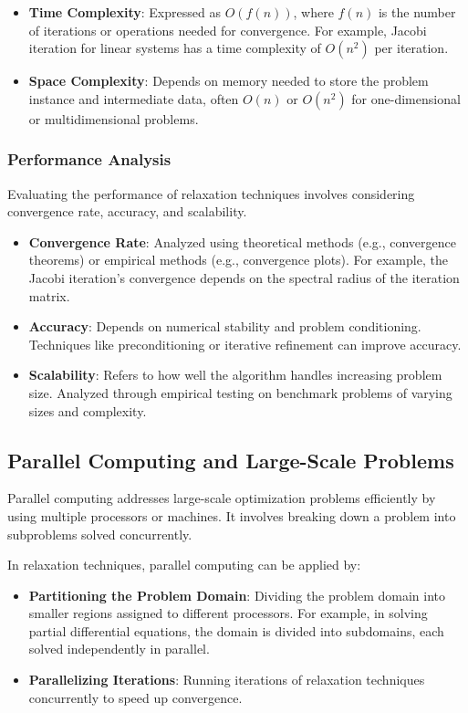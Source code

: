 \documentclass[12pt]{book} %
\begin{document}
\begin{itemize}
    \item \textbf{Time Complexity}: Expressed as \(O(f(n))\), where \(f(n)\) is the number of iterations or operations needed for convergence. For example, Jacobi iteration for linear systems has a time complexity of \(O(n^2)\) per iteration.
    \item \textbf{Space Complexity}: Depends on memory needed to store the problem instance and intermediate data, often \(O(n)\) or \(O(n^2)\) for one-dimensional or multidimensional problems.
\end{itemize}

\subsubsection{Performance Analysis}

Evaluating the performance of relaxation techniques involves considering convergence rate, accuracy, and scalability.

\begin{itemize}
    \item \textbf{Convergence Rate}: Analyzed using theoretical methods (e.g., convergence theorems) or empirical methods (e.g., convergence plots). For example, the Jacobi iteration's convergence depends on the spectral radius of the iteration matrix.
    \item \textbf{Accuracy}: Depends on numerical stability and problem conditioning. Techniques like preconditioning or iterative refinement can improve accuracy.
    \item \textbf{Scalability}: Refers to how well the algorithm handles increasing problem size. Analyzed through empirical testing on benchmark problems of varying sizes and complexity.
\end{itemize}

\subsection{Parallel Computing and Large-Scale Problems}

Parallel computing addresses large-scale optimization problems efficiently by using multiple processors or machines. It involves breaking down a problem into subproblems solved concurrently.

In relaxation techniques, parallel computing can be applied by:

\begin{itemize}
    \item \textbf{Partitioning the Problem Domain}: Dividing the problem domain into smaller regions assigned to different processors. For example, in solving partial differential equations, the domain is divided into subdomains, each solved independently in parallel.
    \item \textbf{Parallelizing Iterations}: Running iterations of relaxation techniques concurrently to speed up convergence.
\end{itemize}
\end{document}
